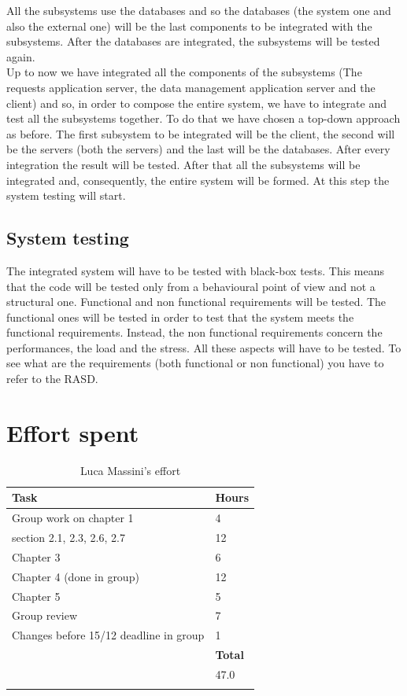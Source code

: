 \documentclass[titlepage]{article}
\begin{document}
All the subsystems use the databases and so the databases (the system one and also the external one) will be the last components to be integrated with the subsystems. After the databases are integrated, the subsystems will be tested again.\\

Up to now we have integrated all the components of the subsystems (The requests application server, the data management application server and the client) and so, in order to compose the entire system, we have to integrate and test all the subsystems together. To do that we have chosen a top-down approach as before. The first subsystem to be integrated will be the client, the second will be the servers (both the servers) and the last will be the databases. After every integration the result will be tested. After that all the subsystems will be integrated and, consequently, the entire system will be formed. At this step the system testing will start.

\subsection{System testing}
The integrated system will have to be tested with black-box tests. This means that the code will be tested only from a behavioural point of view and not a structural one. Functional and non functional requirements will be tested. The functional ones will be tested in order to test that the system meets the functional requirements. Instead, the non functional requirements concern the performances, the load and the stress. All these aspects will have to be tested. To see what are the requirements (both functional or non functional) you have to refer to the RASD. 
\newpage
\section{Effort spent}
\begin{longtable}{| p{12 cm} | p{2 cm} |} 
		\hline
		{\bf Task} & {\bf Hours}\\
		\hline
		 Group work on chapter 1 &  4\\
		 section 2.1, 2.3, 2.6, 2.7 & 12 \\
		 Chapter 3 & 6 \\
		 Chapter 4 (done in group) & 12 \\
		 Chapter 5 & 5 \\
		 Group review  & 7 \\
		 Changes before 15/12 deadline in group & 1 \\

		\hline
		&  {\bf Total} \\
		\hline
		&  47.0 \\
		\hline
		\caption{Luca Massini's effort}
	\end{longtable}
	
\end{document}
